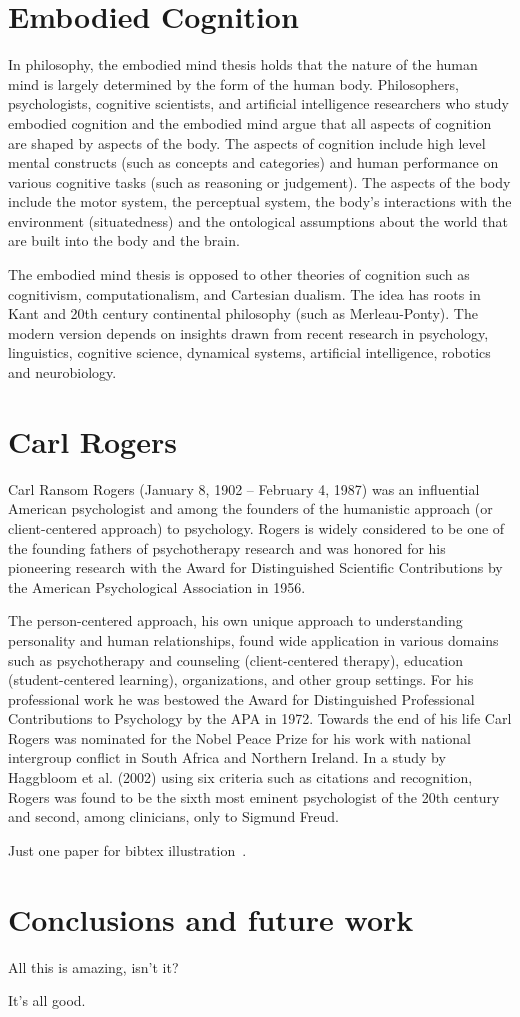 \section{Embodied Cognition}
\label{sec:embodiement}
In philosophy, the embodied mind thesis holds that the nature of the human mind is largely determined by the form of the human body.
Philosophers, psychologists, cognitive scientists, and artificial intelligence researchers who study embodied cognition and the embodied mind argue that all aspects of cognition are shaped by aspects of the body.
The aspects of cognition include high level mental constructs (such as concepts and categories) and human performance on various cognitive tasks (such as reasoning or judgement).
The aspects of the body include the motor system, the perceptual system, the body's interactions with the environment (situatedness) and the ontological assumptions about the world that are built into the body and the brain.

The embodied mind thesis is opposed to other theories of cognition such as cognitivism, computationalism, and Cartesian dualism.
The idea has roots in Kant and 20th century continental philosophy (such as Merleau-Ponty).
The modern version depends on insights drawn from recent research in psychology, linguistics, cognitive science, dynamical systems, artificial intelligence, robotics and neurobiology.

\section{Carl Rogers}
Carl Ransom Rogers (January 8, 1902 -- February 4, 1987) was an influential American psychologist and among the founders of the humanistic approach (or client-centered approach) to psychology.
Rogers is widely considered to be one of the founding fathers of psychotherapy research and was honored for his pioneering research with the Award for Distinguished Scientific Contributions by the American Psychological Association in 1956.

The person-centered approach, his own unique approach to understanding personality and human relationships, found wide application in various domains such as psychotherapy and counseling (client-centered therapy), education (student-centered learning), organizations, and other group settings.
For his professional work he was bestowed the Award for Distinguished Professional Contributions to Psychology by the APA in 1972.
Towards the end of his life Carl Rogers was nominated for the Nobel Peace Prize for his work with national intergroup conflict in South Africa and Northern Ireland.
In a study by Haggbloom et al. (2002) using six criteria such as citations and recognition, Rogers was found to be the sixth most eminent psychologist of the 20th century and second, among clinicians, only to Sigmund Freud.


Just one paper for bibtex illustration~\cite{rogers1967person}.

\section{Conclusions and future work}
\label{sec:concl}
All this is amazing, isn't it?

It's all good.

